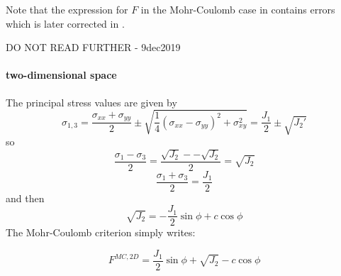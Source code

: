 Note that the expression for $F$ in the Mohr-Coulomb case in \cite{zico74} contains errors
which is later corrected in \cite[p102]{book_zitf}. 









\newpage
DO NOT READ FURTHER - 9dec2019
\paragraph{two-dimensional space}

The principal stress values are given by
\[
\sigma_{1,3} = \frac{\sigma_{xx}+\sigma_{yy}}{2} \pm \sqrt{ \frac{1}{4}(\sigma_{xx}-\sigma_{yy})^2 + \sigma_{xy}^2  }
= \frac{J_1}{2} \pm \sqrt{ J_2'}
\]
so
\[
\frac{\sigma_1-\sigma_3}{2} = \frac{\sqrt{J_2}- - \sqrt{J_2}}{2} = \sqrt{J_2}
\]
\[
\frac{\sigma_1+\sigma_3}{2} =  \frac{J_1}{2} 
\]
and then
\[
\sqrt{J_2} = - \frac{J_1}{2} \sin\phi + c\cos\phi 
\]
The Mohr-Coulomb criterion simply writes:

\begin{mdframed}[backgroundcolor=blue!5]
\begin{equation}
F^{MC,2D}=  \frac{J_1}{2} \sin \phi + \sqrt{J_2} - c  \cos \phi  \label{mc2Dcriterion}
\end{equation}
\end{mdframed}


\newpage
